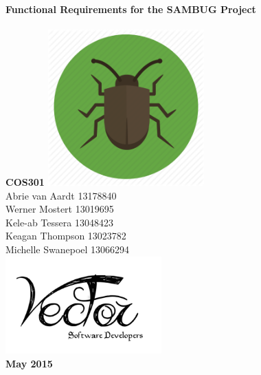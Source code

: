 \documentclass[11pt,a4paper,titlepage]{article}
\begin{document}

\begin{titlepage}
    \centering
    \vfill
    {\bfseries\Huge
         Functional Requirements for the SAMBUG Project\\
      \hfill\\
         \Large COS301
        \vskip2cm
        \includegraphics[width=6cm]{sambug} \\

    }    
    \vfill
        Abrie van Aardt 13178840\\
		Werner Mostert 13019695\\
		Kele-ab Tessera 13048423\\
		Keagan Thompson 13023782\\
		Michelle Swanepoel 13066294\\
    
    
    \vfill
    \includegraphics[width=6cm]{logo} \\
    \textbf{May 2015}
    \vfill
\end{titlepage}
	
    
\end{document}
